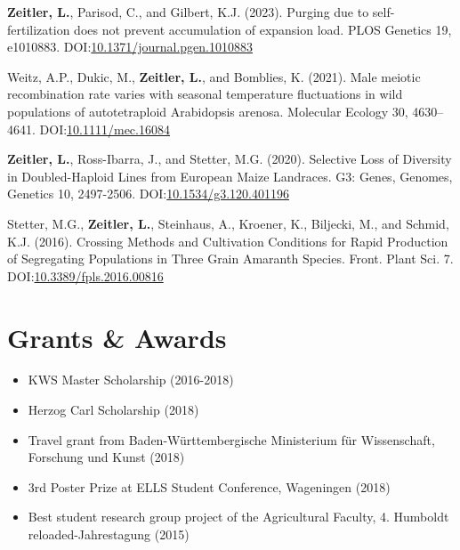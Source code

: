 \documentclass[margin,a4paper]{res}
\begin{document}
\begin{resume}
\begin{etaremune}
\item \textbf{Zeitler, L.}, Parisod, C., and Gilbert, K.J. (2023). Purging due to self-fertilization does not prevent accumulation of expansion load. PLOS Genetics 19, e1010883. DOI:\href{https://doi.org/10.1371/journal.pgen.1010883}{10.1371/journal.pgen.1010883}

\item Weitz, A.P., Dukic, M., \textbf{Zeitler, L.}, and Bomblies, K. (2021). Male meiotic recombination rate varies with seasonal temperature fluctuations in wild populations of autotetraploid Arabidopsis arenosa. Molecular Ecology 30, 4630–4641. DOI:\href{https://doi.org/10.1111/mec.16084}{10.1111/mec.16084}

\item \textbf{Zeitler, L.}, Ross-Ibarra, J., and Stetter, M.G. (2020). Selective Loss of Diversity in Doubled-Haploid Lines from European Maize Landraces. G3: Genes, Genomes, Genetics 10, 2497-2506. DOI:\href{https://doi.org/10.1534/g3.120.401196}{10.1534/g3.120.401196}

\item Stetter, M.G., \textbf{Zeitler, L.}, Steinhaus, A., Kroener, K., Biljecki, M., and Schmid, K.J. (2016). Crossing Methods and Cultivation Conditions for Rapid Production of Segregating Populations in Three Grain Amaranth Species. Front. Plant Sci. 7. DOI:\href{https://doi.org/10.3389/fpls.2016.00816}{10.3389/fpls.2016.00816}
  
\end{etaremune}



\section{Grants \& Awards} 
\begin{itemize}[leftmargin=0pt]\itemsep 2pt
\item[] KWS Master Scholarship (2016-2018)
\item[] Herzog Carl Scholarship (2018)
\item[] Travel grant from Baden-Württembergische Ministerium für Wissenschaft, Forschung und Kunst (2018)
\item[] 3rd Poster Prize at ELLS Student Conference, Wageningen (2018)
\item[] Best student research group project of the Agricultural Faculty, 4. Humboldt reloaded-Jahrestagung (2015)
\end{itemize}


\end{resume}
\end{document}

